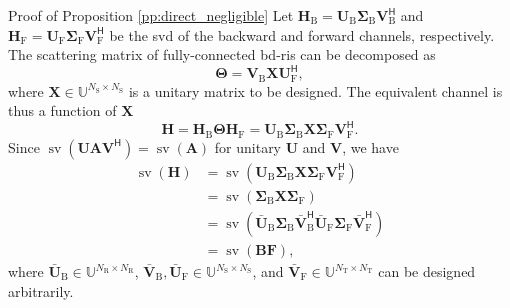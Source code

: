\documentclass[journal]{IEEEtran}
\DeclareMathOperator{\sv}{sv}
\begin{document}
\begin{appendix}
	\begin{subsection}{Proof of Proposition \ref{pp:direct_negligible}}\label{ap:direct_negligible}
		Let $\mathbf{H}_\mathrm{B} = \mathbf{U}_\mathrm{B} \mathbf{\Sigma}_\mathrm{B} \mathbf{V}_\mathrm{B}^\mathsf{H}$ and $\mathbf{H}_\mathrm{F} = \mathbf{U}_\mathrm{F} \mathbf{\Sigma}_\mathrm{F} \mathbf{V}_\mathrm{F}^\mathsf{H}$ be the \gls{svd} of the backward and forward channels, respectively.
		The scattering matrix of fully-connected \gls{bd}-\gls{ris} can be decomposed as
		\begin{equation}
			\mathbf{\Theta} = \mathbf{V}_\mathrm{B} \mathbf{X} \mathbf{U}_\mathrm{F}^\mathsf{H},
			\label{eq:scattering_fc}
		\end{equation}
		where $\mathbf{X} \in \mathbb{U}^{N_\mathrm{S} \times N_\mathrm{S}}$ is a unitary matrix to be designed.
		The equivalent channel is thus a function of $\mathbf{X}$
		\begin{equation}
			\mathbf{H} = \mathbf{H}_\mathrm{B} \mathbf{\Theta} \mathbf{H}_\mathrm{F} = \mathbf{U}_\mathrm{B} \mathbf{\Sigma}_\mathrm{B} \mathbf{X} \mathbf{\Sigma}_\mathrm{F} \mathbf{V}_\mathrm{F}^\mathsf{H}.
			\label{eq:channel_equivalent_fc}
		\end{equation}
		Since $\sv(\mathbf{U} \mathbf{A} \mathbf{V}^\mathsf{H}) = \sv(\mathbf{A})$ for unitary $\mathbf{U}$ and $\mathbf{V}$, we have
		\begin{equation}
			\label{eq:sv_factorization}
			\begin{split}
				\sv(\mathbf{H}) & = \sv(\mathbf{U}_\mathrm{B} \mathbf{\Sigma}_\mathrm{B} \mathbf{X} \mathbf{\Sigma}_\mathrm{F} \mathbf{V}_\mathrm{F}^\mathsf{H})                                                                     \\
			                        & = \sv(\mathbf{\Sigma}_\mathrm{B} \mathbf{X} \mathbf{\Sigma}_\mathrm{F})                                                                                                                            \\
			                        & = \sv(\bar{\mathbf{U}}_\mathrm{B} \mathbf{\Sigma}_\mathrm{B} \mathbf{\bar{V}}_\mathrm{B}^\mathsf{H} \bar{\mathbf{U}}_\mathrm{F} \mathbf{\Sigma}_\mathrm{F} \mathbf{\bar{V}}_\mathrm{F}^\mathsf{H}) \\
			                        & = \sv(\mathbf{BF}),
			\end{split}
		\end{equation}
		where $\bar{\mathbf{U}}_{\mathrm{B}} \in \mathbb{U}^{N_\mathrm{R} \times N_\mathrm{R}}$, $\bar{\mathbf{V}}_\mathrm{B}, \bar{\mathbf{U}}_\mathrm{F} \in \mathbb{U}^{N_\mathrm{S} \times N_\mathrm{S}}$, and $\bar{\mathbf{V}}_\mathrm{F} \in \mathbb{U}^{N_\mathrm{T} \times N_\mathrm{T}}$ can be designed arbitrarily.
	\end{subsection}


\end{appendix}
\end{document}
